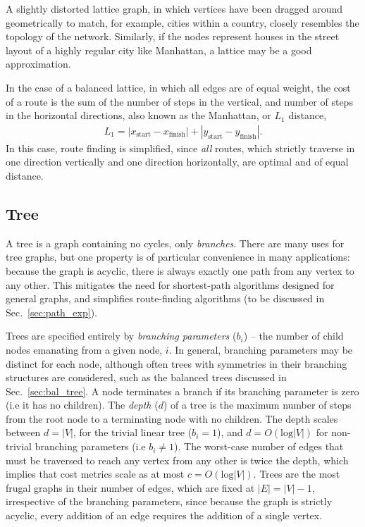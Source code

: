 \documentclass[aps,rmp,twocolumn,amsmath,amssymb,nofootinbib,superscriptaddress]{revtex4}
\begin{document}
A slightly distorted lattice graph, in which vertices have been dragged around geometrically to match, for example, cities within a country, closely resembles the topology of the network. Similarly, if the nodes represent houses in the street layout of a highly regular city like Manhattan, a lattice may be a good approximation.

In the case of a balanced lattice, in which all edges are of equal weight, the cost of a route is the sum of the number of steps in the vertical, and number of steps in the horizontal directions, also known as the Manhattan, or $L_1$ distance,
\begin{align}
L_1 = |x_\mathrm{start} - x_\mathrm{finish}| + |y_\mathrm{start} - y_\mathrm{finish}|.
\end{align}
In this case, route finding is simplified, since \emph{all} routes, which strictly traverse in one direction vertically and one direction horizontally, are optimal and of equal distance.

%
%

\subsection{Tree} \label{sec:tree_graph}

A tree is a graph containing no cycles, only \emph{branches}. There are many uses for tree graphs, but one property is of particular convenience in many applications: because the graph is acyclic, there is always exactly one path from any vertex to any other. This mitigates the need for shortest-path algorithms designed for general graphs, and simplifies route-finding algorithms (to be discussed in Sec.~\ref{sec:path_exp}).

Trees are specified entirely by \emph{branching parameters} ($b_i$) -- the number of child nodes emanating from a given node, $i$. In general, branching parameters may be distinct for each node, although often trees with symmetries in their branching structures are considered, such as the balanced trees discussed in Sec.~\ref{sec:bal_tree}. A node terminates a branch if its branching parameter is zero (i.e it has no children). The \emph{depth} ($d$) of a tree is the maximum number of steps from the root node to a terminating node with no children. The depth scales between \mbox{$d=|V|$}, for the trivial linear tree (\mbox{$b_i=1$}), and \mbox{$d=O(\mathrm{log}|V|)$} for non-trivial branching parameters (i.e \mbox{$b_i\neq 1$}). The worst-case number of edges that must be traversed to reach any vertex from any other is twice the depth, which implies that cost metrics scale as at most \mbox{$c=O(\mathrm{log}|V|)$}. Trees are the most frugal graphs in their number of edges, which are fixed at \mbox{$|E|=|V|-1$}, irrespective of the branching parameters, since because the graph is strictly acyclic, every addition of an edge requires the addition of a single vertex.
\end{document}
